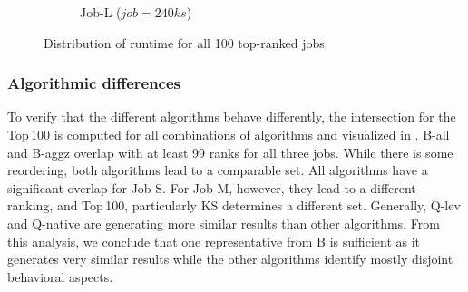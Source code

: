 \documentclass{jhps}
\begin{document}
\begin{figure}
\begin{subfigure}{0.31\textwidth}
\caption{Job-L ($job=240ks$)}\label{fig:runtime-job-L}
\end{subfigure}
\centering
\caption{Distribution of runtime for all 100 top-ranked jobs}%
\label{fig:runtime-job}
\end{figure}

\subsubsection{Algorithmic differences}
To verify that the different algorithms behave differently, the intersection for the Top\,100 is computed for all combinations of algorithms and visualized in .
B-all and B-aggz overlap with at least 99 ranks for all three jobs.
While there is some reordering, both algorithms lead to a comparable set.
All algorithms have a significant overlap for Job-S.
For Job-M, however, they lead to a different ranking, and Top\,100, particularly KS determines a different set.
Generally, Q-lev and Q-native are generating more similar results than other algorithms.
From this analysis, we conclude that one representative from B is sufficient as it generates very similar results while the other algorithms identify mostly disjoint behavioral aspects. %
\end{document}
